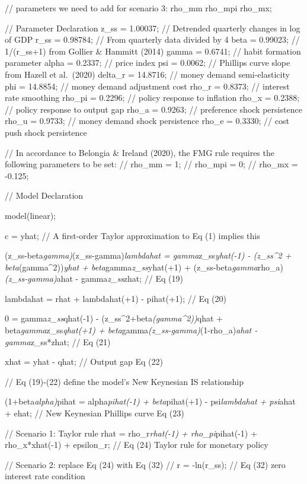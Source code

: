 \documentclass[11pt,preprint, authoryear]{elsarticle}
\numberwithin{equation}{section}
\numberwithin{figure}{section}
\numberwithin{table}{section}
\begin{document}
// parameters we need to add for scenario 3: rho\_mm rho\_mpi rho\_mx;

// Parameter Declaration z\_ss = 1.00037; // Detrended quarterly changes
in log of GDP r\_ss = 0.98784; // From quarterly data divided by 4 beta
= 0.99023; // 1/(r\_ss+1) from Gollier \& Hammitt (2014) gamma = 0.6741;
// habit formation parameter alpha = 0.2337; // price index psi =
0.0062; // Phillips curve slope from Hazell et al.~(2020) delta\_r =
14.8716; // money demand semi-elasticity phi = 14.8854; // money demand
adjustment cost rho\_r = 0.8373; // interest rate smoothing rho\_pi =
0.2296; // policy response to inflation rho\_x = 0.2388; // policy
response to output gap rho\_a = 0.9263; // preference shock persistence
rho\_u = 0.9733; // money demand shock persistence rho\_e = 0.3330; //
cost push shock persistence

// In accordance to Belongia \& Ireland (2020), the FMG rule requires
the following parameters to be set: // rho\_mm = 1; // rho\_mpi = 0; //
rho\_mx = -0.125;

// Model Declaration

model(linear);

c = yhat; // A first-order Taylor approximation to Eq (1) implies this

(z\_ss-beta\emph{gamma)}(z\_ss-gamma)\emph{lambdahat =
gamma}z\_ss\emph{yhat(-1) - (z\_ss\^{}2 + beta}(gamma\^{}2))\emph{yhat +
beta}gamma\emph{z\_ss}yhat(+1) +
(z\_ss-beta\emph{gamma}rho\_a)\emph{(z\_ss-gamma)}ahat -
gamma\emph{z\_ss}zhat; // Eq (19)

lambdahat = rhat + lambdahat(+1) - pihat(+1); // Eq (20)

0 = gamma\emph{z\_ss}qhat(-1) - (z\_ss\^{}2+beta\emph{(gamma\^{}2))}qhat
+ beta\emph{gamma}z\_ss\emph{qhat(+1) +
beta}gamma\emph{(z\_ss-gamma)}(1-rho\_a)\emph{ahat - gamma}z\_ss*zhat;
// Eq (21)

xhat = yhat - qhat; // Output gap Eq (22)

// Eq (19)-(22) define the model's New Keynesian IS relationship

(1+beta\emph{alpha)}pihat = alpha\emph{pihat(-1) + beta}pihat(+1) -
psi\emph{lambdahat + psi}ahat + ehat; // New Keynesian Phillips curve Eq
(23)

// Scenario 1: Taylor rule rhat = rho\_r\emph{rhat(-1) +
rho\_pi}pihat(-1) + rho\_x*xhat(-1) + epsilon\_r; // Eq (24) Taylor rule
for monetary policy

// Scenario 2: replace Eq (24) with Eq (32) // r = -ln(r\_ss); // Eq
(32) zero interest rate condition
\end{document}
